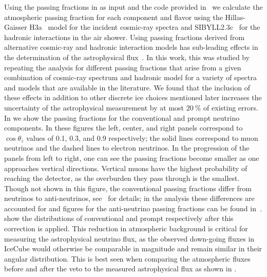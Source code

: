 Using the passing fractions in  as input and the \nuveto{} code provided in~\cite{Arguelles:2018awr} we calculate the atmospheric passing fraction for each component and flavor using the Hillas-Gaisser H3a~\cite{Gaisser:2013bla,Gaisser:2011cc,Hillas:2006ms} model for the incident cosmic-ray spectra and SIBYLL2.3c~\cite{Riehn:2017mfm} for the hadronic interactions in the air shower.
Using passing fractions derived from alternative cosmic-ray and hadronic interaction models has sub-leading effects in the determination of the astrophysical flux~\cite{Arguelles:2018awr}.
In this work, this was studied by repeating the analysis for different passing fractions that arise from a given combination of cosmic-ray spectrum and hadronic model for a variety of spectra and models that are available in the literature.
We found that the inclusion of these effects in addition to other discrete ice choices mentioned later increases the uncertainty of the astrophysical measurement by at most $\SI{20}\percent$ of existing errors.
In  we show the passing fractions for the conventional and prompt neutrino components.
In these figures the left, center, and right panels correspond to $\cos\theta_z$ values of 0.1, 0.3, and 0.9 respectively; the solid lines correspond to muon neutrinos and the dashed lines to electron neutrinos.
In the progression of the panels from left to right, one can see the passing fractions become smaller as one approaches vertical directions.
Vertical muons have the highest probability of reaching the detector, as the overburden they pass through is the smallest.
Though not shown in this figure, the conventional passing fractions differ from neutrinos to anti-neutrinos, see~\cite{Arguelles:2018awr} for details; in the analysis these differences are accounted for and figures for the anti-neutrino passing fractions can be found in~\cite{HESE:datarelease}.%
 show the distributions of conventional and prompt respectively after this correction is applied.
This reduction in atmospheric background is critical for measuring the astrophysical neutrino flux, as the observed down-going fluxes in IceCube would otherwise be comparable in magnitude and remain similar in their angular distribution.
This is best seen when comparing the atmospheric fluxes before and after the veto to the measured astrophysical flux as shown in .

